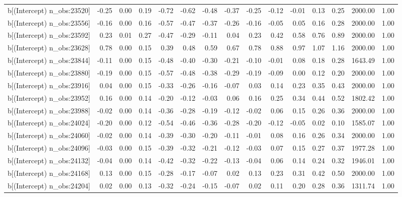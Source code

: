 \begin{table}[ht]
\begin{tabular}{rrrrrrrrrrrrrrr}
  b[(Intercept) n\_obs:23520] & -0.25 & 0.00 & 0.19 & -0.72 & -0.62 & -0.48 & -0.37 & -0.25 & -0.12 & -0.01 & 0.13 & 0.25 & 2000.00 & 1.00 \\ 
  b[(Intercept) n\_obs:23556] & -0.16 & 0.00 & 0.16 & -0.57 & -0.47 & -0.37 & -0.26 & -0.16 & -0.05 & 0.05 & 0.16 & 0.28 & 2000.00 & 1.00 \\ 
  b[(Intercept) n\_obs:23592] & 0.23 & 0.01 & 0.27 & -0.47 & -0.29 & -0.11 & 0.04 & 0.23 & 0.42 & 0.58 & 0.76 & 0.89 & 2000.00 & 1.00 \\ 
  b[(Intercept) n\_obs:23628] & 0.78 & 0.00 & 0.15 & 0.39 & 0.48 & 0.59 & 0.67 & 0.78 & 0.88 & 0.97 & 1.07 & 1.16 & 2000.00 & 1.00 \\ 
  b[(Intercept) n\_obs:23844] & -0.11 & 0.00 & 0.15 & -0.48 & -0.40 & -0.30 & -0.21 & -0.10 & -0.01 & 0.08 & 0.18 & 0.28 & 1643.49 & 1.00 \\ 
  b[(Intercept) n\_obs:23880] & -0.19 & 0.00 & 0.15 & -0.57 & -0.48 & -0.38 & -0.29 & -0.19 & -0.09 & 0.00 & 0.12 & 0.20 & 2000.00 & 1.00 \\ 
  b[(Intercept) n\_obs:23916] & 0.04 & 0.00 & 0.15 & -0.33 & -0.26 & -0.16 & -0.07 & 0.03 & 0.14 & 0.23 & 0.35 & 0.43 & 2000.00 & 1.00 \\ 
  b[(Intercept) n\_obs:23952] & 0.16 & 0.00 & 0.14 & -0.20 & -0.12 & -0.03 & 0.06 & 0.16 & 0.25 & 0.34 & 0.44 & 0.52 & 1802.42 & 1.00 \\ 
  b[(Intercept) n\_obs:23988] & -0.02 & 0.00 & 0.14 & -0.36 & -0.28 & -0.19 & -0.12 & -0.02 & 0.06 & 0.15 & 0.26 & 0.36 & 2000.00 & 1.00 \\ 
  b[(Intercept) n\_obs:24024] & -0.20 & 0.00 & 0.12 & -0.54 & -0.46 & -0.36 & -0.28 & -0.20 & -0.12 & -0.05 & 0.02 & 0.10 & 1585.07 & 1.00 \\ 
  b[(Intercept) n\_obs:24060] & -0.02 & 0.00 & 0.14 & -0.39 & -0.30 & -0.20 & -0.11 & -0.01 & 0.08 & 0.16 & 0.26 & 0.34 & 2000.00 & 1.00 \\ 
  b[(Intercept) n\_obs:24096] & -0.03 & 0.00 & 0.15 & -0.39 & -0.32 & -0.21 & -0.12 & -0.03 & 0.07 & 0.15 & 0.27 & 0.37 & 1977.28 & 1.00 \\ 
  b[(Intercept) n\_obs:24132] & -0.04 & 0.00 & 0.14 & -0.42 & -0.32 & -0.22 & -0.13 & -0.04 & 0.06 & 0.14 & 0.24 & 0.32 & 1946.01 & 1.00 \\ 
  b[(Intercept) n\_obs:24168] & 0.13 & 0.00 & 0.15 & -0.28 & -0.17 & -0.07 & 0.02 & 0.13 & 0.23 & 0.31 & 0.42 & 0.50 & 2000.00 & 1.00 \\ 
  b[(Intercept) n\_obs:24204] & 0.02 & 0.00 & 0.13 & -0.32 & -0.24 & -0.15 & -0.07 & 0.02 & 0.11 & 0.20 & 0.28 & 0.36 & 1311.74 & 1.00 \\ 

\end{tabular}
\end{table}
